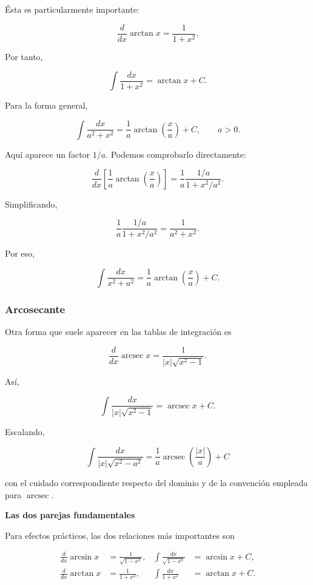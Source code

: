 \documentclass[12pt]{article}
\theoremstyle{definition}
\theoremstyle{remark}
\begin{document}
Ésta es particularmente importante:

\[
\frac{d}{dx}\arctan x
=
\frac{1}{1+x^2}.
\]

Por tanto,

\[
\boxed{
\int\frac{dx}{1+x^2}
=
\arctan x+C
}.
\]

Para la forma general,

\[
\boxed{
\int\frac{dx}{a^2+x^2}
=
\frac1a\arctan\left(\frac{x}{a}\right)+C,
\qquad a>0.
}
\]

Aquí aparece un factor \(1/a\). Podemos comprobarlo directamente:

\[
\frac{d}{dx}
\left[
\frac1a\arctan\left(\frac{x}{a}\right)
\right]
=
\frac1a
\frac{1/a}{1+x^2/a^2}.
\]

Simplificando,

\[
\frac1a
\frac{1/a}{1+x^2/a^2}
=
\frac{1}{a^2+x^2}.
\]

Por eso,

\[
\boxed{
\int\frac{dx}{x^2+a^2}
=
\frac1a\arctan\left(\frac{x}{a}\right)+C.
}
\]

\subsubsection*{Arcosecante}

Otra forma que suele aparecer en las tablas de integración es

\[
\frac{d}{dx}\operatorname{arcsec}x
=
\frac{1}{|x|\sqrt{x^2-1}}.
\]

Así,

\[
\boxed{
\int
\frac{dx}{|x|\sqrt{x^2-1}}
=
\operatorname{arcsec}x+C
}.
\]

Escalando,

\[
\boxed{
\int
\frac{dx}{|x|\sqrt{x^2-a^2}}
=
\frac1a
\operatorname{arcsec}\left(\frac{|x|}{a}\right)+C
}
\]

con el cuidado correspondiente respecto del dominio y de la
convención empleada para \(\operatorname{arcsec}\).

\textbf{Las dos parejas fundamentales}

Para efectos prácticos, las dos relaciones más importantes son

\[
\boxed{
\begin{aligned}
\frac{d}{dx}\arcsin x
&=\frac{1}{\sqrt{1-x^2}},
&
\int\frac{dx}{\sqrt{1-x^2}}
&=\arcsin x+C,
\\[3mm]
\frac{d}{dx}\arctan x
&=\frac{1}{1+x^2},
&
\int\frac{dx}{1+x^2}
&=\arctan x+C.
\end{aligned}}
\]
\end{document}
